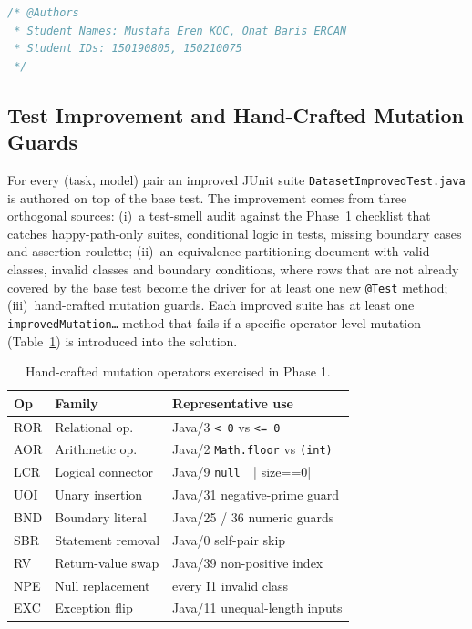 \documentclass[journal]{IEEEtran}
\begin{document}
\begin{lstlisting}[language=Java, caption=Required header block prepended to every generated solution and test file.]
/* @Authors
 * Student Names: Mustafa Eren KOC, Onat Baris ERCAN
 * Student IDs: 150190805, 150210075
 */
\end{lstlisting}

\subsection{Test Improvement and Hand-Crafted Mutation Guards}

For every (task, model) pair an improved JUnit suite
\texttt{DatasetImprovedTest.java} is authored on top of the base test.
The improvement comes from three orthogonal sources: (i)~a test-smell
audit against the Phase~1 checklist that catches happy-path-only suites,
conditional logic in tests, missing boundary cases and assertion
roulette; (ii)~an equivalence-partitioning document with valid classes,
invalid classes and boundary conditions, where rows that are not already
covered by the base test become the driver for at least one new
\texttt{@Test} method; (iii)~hand-crafted mutation guards. Each improved
suite has at least one \texttt{improvedMutation\ldots} method that fails
if a specific operator-level mutation (Table~\ref{tab:mutation-catalogue})
is introduced into the solution.

\begin{table}[!t]
\renewcommand{\arraystretch}{1.15}
\caption{Hand-crafted mutation operators exercised in Phase 1.}
\label{tab:mutation-catalogue}
\centering
\footnotesize
\begin{tabular}{@{}lp{1.9cm}p{3.5cm}@{}}
\toprule
\textbf{Op} & \textbf{Family} & \textbf{Representative use} \\
\midrule
ROR & Relational op.        & Java/3 \verb|< 0| vs \verb|<= 0| \\
AOR & Arithmetic op.        & Java/2 \texttt{Math.floor} vs \texttt{(int)} \\
LCR & Logical connector     & Java/9 \verb|null  ||  size==0| \\
UOI & Unary insertion       & Java/31 negative-prime guard \\
BND & Boundary literal      & Java/25 / 36 numeric guards \\
SBR & Statement removal     & Java/0 self-pair skip \\
RV  & Return-value swap     & Java/39 non-positive index \\
NPE & Null replacement      & every I1 invalid class \\
EXC & Exception flip        & Java/11 unequal-length inputs \\
\bottomrule
\end{tabular}
\end{table}
\end{document}
